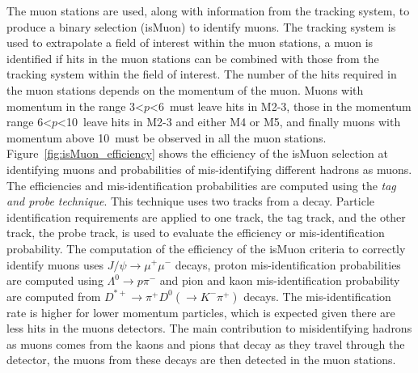 The muon stations are used, along with information from the tracking system, to produce a binary selection (isMuon) to identify muons. The tracking system is used to extrapolate a field of interest within the muon stations, a muon is identified if hits in the muon stations can be combined with those from the tracking system within the field of interest. The number of the hits required in the muon stations depends on the momentum of the muon. Muons with momentum in the range 3<$p$<6~\gevc must leave hits in M2-3, those in the momentum range 6<$p$<10~\gevc leave hits in M2-3 and either M4 or M5, and finally muons with momentum above 10~\gevc must be observed in all the muon stations. Figure~\ref{fig:isMuon_efficiency} shows the efficiency of the isMuon selection at identifying muons and probabilities of mis-identifying different hadrons as muons. The efficiencies and mis-identification probabilities are computed using the {\it tag and probe technique}. This technique uses two tracks from a decay. Particle identification requirements are applied to one track, the tag track, and the other track, the probe track, is used to evaluate the efficiency or mis-identification probability. The computation of the efficiency of the isMuon criteria to correctly identify muons uses $J/\psi \to \mu^+ \mu^-$ decays, proton mis-identification probabilities are computed using $\Lambda^0 \to p \pi^-$ and pion and kaon mis-identification probability are computed from $D^{*+} \to \pi^+ D^0 (\to K^- \pi^+)$ decays. The mis-identification rate is higher for lower momentum particles, which is expected given there are less hits in the muons detectors. The main contribution to misidentifying hadrons as muons comes from the kaons and pions that decay as they travel through the detector, the muons from these decays are then detected in the muon stations.


